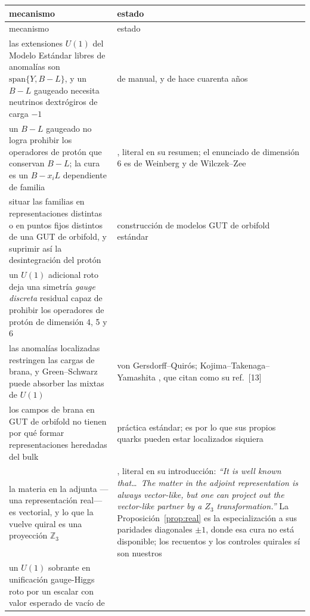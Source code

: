 \documentclass[11pt,a4paper]{article}
\newcommand{\ZZ}{\mathbb{Z}}
\begin{document}
\begingroup\small
\begin{longtable}{p{}p{}}
\toprule
\rowcolor{hdrblue!12}
mecanismo & estado\\
\midrule
\endfirsthead
\toprule
\rowcolor{hdrblue!12}
mecanismo & estado\\
\midrule
\endhead
las extensiones $U(1)$ del Modelo Estándar libres de anomalías son
$\mathrm{span}\{Y,B-L\}$, y un $B-L$ gaugeado necesita neutrinos dextrógiros de carga $-1$ &
de manual, y de hace cuarenta años\\
un $B-L$ gaugeado no logra prohibir los operadores de protón que conservan $B-L$; la cura es un
$B-x_iL$ dependiente de familia & \cite{FamilyU1}, literal en su resumen; el enunciado de
dimensión 6 es de Weinberg y de Wilczek--Zee \cite{Weinberg,WZ}\\
situar las familias en representaciones distintas o en puntos fijos distintos de una GUT de
orbifold, y suprimir así la desintegración del protón & construcción de modelos GUT de orbifold
estándar \cite{Raby,OrbGUT}\\
un $U(1)$ adicional roto deja una simetría \emph{gauge discreta} residual capaz de prohibir los
operadores de protón de dimensión 4, 5 y 6 & \cite{KW,IR,DiscGauge,Orth}\\
las anomalías localizadas restringen las cargas de brana, y Green--Schwarz puede absorber las mixtas
de $U(1)$ & von Gersdorff--Quir\'os; Kojima--Takenaga--Yamashita \cite{KTY}, que \cite{KM25} citan
como su ref.~[13]\\
los campos de brana en GUT de orbifold no tienen por qué formar representaciones heredadas del bulk &
práctica estándar; es por lo que sus propios quarks pueden estar localizados siquiera\\
la materia en la adjunta ---una representación real--- es vectorial, y lo que la vuelve quiral es una
proyección $\ZZ_3$ & \cite{GMN}, literal en su introducción: \emph{``It is well known that\dots\ The
matter in the adjoint representation is always vector-like, but one can project out the vector-like
partner by a $Z_3$ transformation.''} La Proposición~\ref{prop:real} es la especialización a sus
paridades diagonales $\pm1$, donde esa cura no está disponible; los recuentos y los controles
quirales sí son nuestros\\
un $U(1)$ sobrante en unificación gauge-Higgs roto por un escalar con valor esperado de vacío de

\end{longtable}
\end{document}
